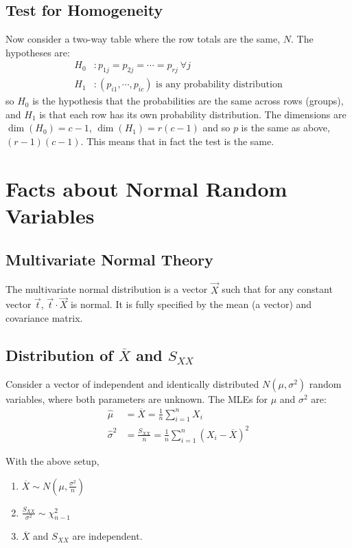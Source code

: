\documentclass[../Main.tex]{subfiles}
\begin{document}
\subsection{Test for Homogeneity}
Now consider a two-way table where the row totals are the same, $N$. The hypotheses are:
\begin{align*}
    H_0&: p_{1j} = p_{2j} = \cdots = p_{rj} ~\forall j \\
    H_1&: (p_{i1}, \cdots, p_{ic}) \text{ is any probability distribution}
\end{align*}
so $H_0$ is the hypothesis that the probabilities are the same across rows (groups), and $H_1$ is that each row has its own probability distribution. The dimensions are $\dim(H_0) = c-1$, $\dim(H_1) = r(c-1)$ and so $p$ is the same as above, $(r-1)(c-1)$. This means that in fact the test is the same.
\section{Facts about Normal Random Variables}
\subsection{Multivariate Normal Theory}
The multivariate normal distribution is a vector $\vec{X}$ such that for any constant vector $\vec{t}$, $\vec{t} \cdot \vec{X}$ is normal. It is fully specified by the mean (a vector) and covariance matrix.
\subsection{Distribution of \texorpdfstring{$\overline{X}$}{the mean of X} and \texorpdfstring{$S_{XX}$}{Sxx}}
Consider a vector of independent and identically distributed $N(\mu, \sigma^2)$ random variables, where both parameters are unknown. The MLEs for $\mu$ and $\sigma^2$ are:
\begin{align*}
    \hat{\mu} &= \overline{X} = \frac{1}{n} \sum_{i=1}^{n} X_i \\
    \hat{\sigma}^2 &= \frac{S_{XX}}{n} = \frac{1}{n} \sum_{i=1}^{n} (X_i - \overline{X})^2
\end{align*}
\begin{theorem}
    With the above setup,
    \begin{enumerate}
        \item $\overline{X} \sim N\left(\mu, \frac{\sigma^2}{n}\right)$
        \item $\frac{S_{XX}}{\sigma^2} \sim \chi_{n-1}^2$
        \item $\overline{X}$ and $S_{XX}$ are independent.
    \end{enumerate}
    \label{thmXBarSxx}
\end{theorem}
\end{document}
